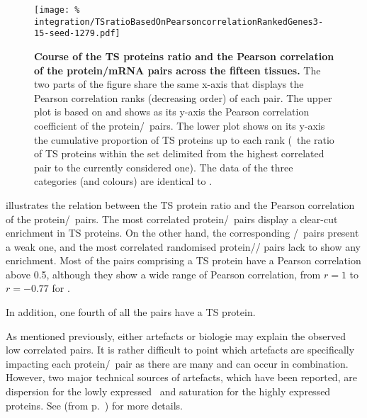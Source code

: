 \begin{figure}[!htb]
    \texttt{[image: \%
integration/TSratioBasedOnPearsoncorrelationRankedGenes3-15-seed-1279.pdf]}\centering
    \vspace{-3mm}
    \caption[Course of the TS proteins ratio and the Pearson correlation
    of protein/mRNA pairs]{\label{fig:Spe_Cor}%
    \textbf{Course of the TS proteins ratio and the Pearson correlation
    of the protein/mRNA pairs across the fifteen tissues.}
    The two parts of the figure share the same x-axis
    that displays the Pearson correlation ranks (decreasing order) of each pair.
    The upper plot is based on 
    and shows as its y-axis the Pearson correlation coefficient
    of the protein/\mRNA\ pairs.
    The lower plot shows on its y-axis
    the cumulative proportion of \gls{TS} proteins up to each rank
    (\ie\ the ratio of \gls{TS} proteins
    within the set delimited from the highest correlated pair
    to the currently considered one).
    The data of the three categories (and colours)
    are identical to .}
\end{figure}

\vspace{-1mm}
 illustrates the relation between the \gls{TS} protein ratio
and the Pearson correlation of the protein/\mRNA\ pairs.
The most correlated protein/\mRNA\ pairs display
a clear-cut enrichment in \gls{TS} proteins.
On the other hand, the corresponding \mRNA/\mRNA\ pairs present a weak one,
and the most correlated randomised protein/\mRNA/ pairs
lack to show any enrichment.
Most of the pairs comprising a \gls{TS} protein have
a Pearson correlation above 0.5,
although they show a wide range of Pearson correlation,
from $r=1$ to $r= -0.77$ for .\\
\vspace{-\baselineskip}

In addition, one fourth of all the pairs have a \gls{TS} protein.

As mentioned previously,
either artefacts or biologie may explain the observed low correlated pairs.
It is rather difficult to point
which artefacts are specifically impacting each protein/\mRNA\ pair
as there are many and can occur in combination.
However, two major technical sources of artefacts,
which have been reported,
are dispersion for the lowly expressed \mRNAs\ and
saturation for the highly expressed proteins.
See  (from p.~\pageref{sec:transExplo})
for more details.
\vspace{-2mm}

